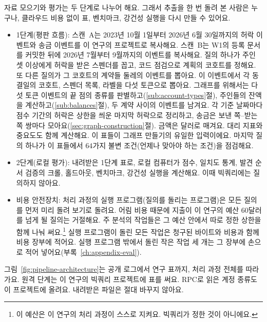 
자료 모으기와 평가는 두 단계로 나누어 해요. 그래서 추출을 한 번 돌려 본 사람은 누구나, 클라우드 비용 없이 표, 벤치마크, 강건성 실행을 다시 만들 수 있어요.

\begin{itemize}
\item 1단계(평판 흐름): 스캔~A는 2023년 10월 1일부터 2026년 6월 30일까지의 허락 이벤트와 송금 이벤트를 이 연구의 프로젝트로 복사해요. 스캔~B는 W1의 등록 문서를 커밋한 뒤에 2026년 7월부터 9월까지의 이벤트를 복사해요. 질의 하나가 주인 셋 이상에게 허락을 받은 스펜더를 꼽고, 코드 점검으로 계획의 코호트를 정해요. 또 다른 질의가 그 코호트의 계약들 둘레의 이벤트를 뽑아요. 이 이벤트에서 각 동결일의 코호트, 스펜더 목록, 라벨을 다섯 토큰으로 뽑아요. 그래프를 위해서는 다섯 토큰 이벤트의 끝 점의 종류를 판별하고(\ref{sub:account-types}절), 주인들의 잔액을 계산하고(\ref{sub:balances}절), 두 계약 사이의 이벤트를 남겨요. 각 기준 날짜마다 점수 기간의 허락은 상한을 씌운 마지막 허락으로 정리하고, 송금은 보낸 쪽–받는 쪽 쌍마다 모아요(\ref{sec:graph-construction}절). 금액은 달러로 매겨요. 대리 지표와 중요도도 함께 계산해요. 이 표들이 그래프 만들기의 유일한 입력이에요. 마지막 질의 하나가 이 표들에서 $64$가지 불변 조건(언제나 맞아야 하는 조건)을 점검해요.

\item 2단계(로컬 평가): 내려받은 1단계 표로, 로컬 컴퓨터가 점수, 일치도 통계, 발견 순서 검증의 크롤, 홀드아웃, 벤치마크, 강건성 실행을 계산해요. 이때 빅쿼리에는 질의하지 않아요.

\item 비용 안전장치: 처리 과정의 실행 프로그램(질의를 돌리는 프로그램)은 모든 질의를 먼저 미리 돌려 보기로 돌려요. 어림 비용 때문에 지출이 이 연구의 예산 $60$달러를 넘게 될 질의는 거절해요. 주 분석의 작업들은 그 예산 안에서 따로 정한 상한을 함께 나눠 써요.\footnote{이 예산은 이 연구의 처리 과정이 스스로 지켜요. 빅쿼리가 정한 것이 아니에요.} 실행 프로그램이 돌린 모든 작업은 청구된 바이트와 비용과 함께 비용 장부에 적어요. 실행 프로그램 밖에서 돌린 작은 작업 세 개는 그 장부에 손으로 적어 넣어요(부록~\ref{ch:appendix-eval}).

\end{itemize}


그림~\ref{fig:pipeline-architecture}는 공개 로그에서 연구 표까지, 처리 과정 전체를 따라가요. 원격 단계는 이 연구의 빅쿼리 프로젝트에 표를 써요. RPC로 읽은 계정 종류도 이 프로젝트에 올려요. 내려받은 파일은 절대 바꾸지 않아요.

